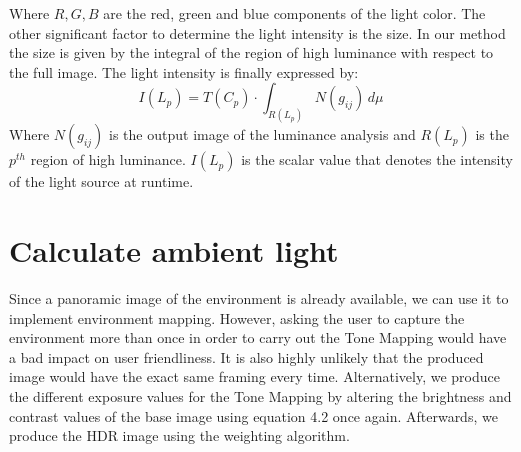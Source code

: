\begin{enumerate}
Where $R, G, B$ are the red, green and blue components of the light color.\newline 
The other significant factor to determine the light intensity is the size. In our method the size is given by the integral of the region of high luminance with respect to the full image.\newline
The light intensity is finally expressed by:
\begin{equation}
I(L_p) = T(C_p) \cdot \int_{R(L_p)} N(g_{ij}) \,d\mu
\end{equation}
Where $N(g_{ij})$ is the output image of the luminance analysis and $R(L_p)$ is the $p^{th}$ region of high luminance. $I(L_p)$ is the scalar value that denotes the intensity of the light source at runtime.\newline 

\end{enumerate}

\section{Calculate ambient light}
Since a panoramic image of the environment is already available, we can use it to implement environment mapping. However, asking the user to capture the environment more than once in order to carry out the Tone Mapping would have a bad impact on user friendliness. It is also highly unlikely that the produced image would have the exact same framing every time. Alternatively, we produce the different exposure values for the Tone Mapping by altering the brightness and contrast values of the base image using equation 4.2 once again. Afterwards, we produce the HDR image using the \citet{Debevec} weighting algorithm.\newline

